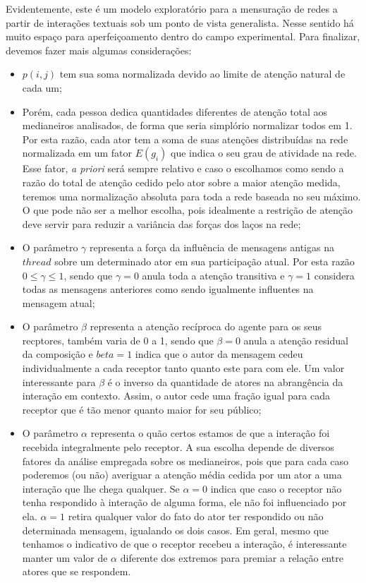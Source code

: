 \documentclass{article}
\begin{document}
Evidentemente, este é um modelo exploratório para a mensuração de redes a partir
de interações textuais sob um ponto de vista generalista. Nesse sentido há muito
espaço para aperfeiçoamento dentro do campo experimental. Para finalizar,
devemos fazer mais algumas considerações:
\begin{itemize}
  \item $p(i,j)$ tem sua soma normalizada devido ao limite de atenção
  natural de cada um;
  \item Porém, cada pessoa dedica quantidades diferentes de atenção total aos
  medianeiros analisados, de forma que seria simplório normalizar todos em 1.
  Por esta razão, cada ator tem a soma de suas atenções distribuídas na rede
  normalizada em um fator $E(g_i)$ que indica o seu grau de atividade na rede.
  Esse fator, \textit{a priori} será sempre relativo e caso o escolhamos como
  sendo a razão do total de atenção cedido pelo ator sobre a maior atenção
  medida, teremos uma normalização absoluta para toda a rede baseada no seu
  máximo. O que pode não ser a melhor escolha, pois idealmente a restrição de
  atenção deve servir para reduzir a variância das forças dos laços na rede;
  \item O parâmetro $\gamma$ representa a força da influência de mensagens
  antigas na $thread$ sobre um determinado ator em sua participação atual. Por
  esta razão $0 \leq \gamma \leq 1$, sendo que $\gamma=0$ anula toda a atenção
  transitiva e $\gamma=1$ considera todas as mensagens anteriores como sendo
  igualmente influentes na mensagem atual;
  \item O parâmetro $\beta$ representa a atenção recíproca do agente para os
  seus recptores, também varia de 0 a 1, sendo que $\beta=0$ anula a atenção
  residual da composição e $beta=1$ indica que o autor da mensagem cedeu
  individualmente a cada receptor tanto quanto este para com ele. Um valor
  interessante para $\beta$ é o inverso da quantidade de atores na abrangência
  da interação em contexto. Assim, o autor cede uma fração igual para cada
  receptor que é tão menor quanto maior for seu público;
  \item O parâmetro $\alpha$ representa o quão certos estamos de que a interação
  foi recebida integralmente pelo receptor. A sua escolha depende de diversos
  fatores da análise empregada sobre os medianeiros, pois que para cada caso
  poderemos (ou não) averiguar a atenção média cedida por um ator a uma
  interação que lhe chega qualquer. Se $\alpha=0$ indica que caso o receptor não
  tenha respondido à interação de alguma forma, ele não foi influenciado por
  ela. $\alpha=1$ retira qualquer valor do fato do ator ter respondido ou não
  determinada mensagem, igualando os dois casos. Em geral, mesmo que tenhamos o
  indicativo de que o receptor recebeu a interação, é interessante manter um
  valor de $\alpha$ diferente dos extremos para premiar a relação entre atores
  que se respondem.
\end{itemize}
\end{document}
